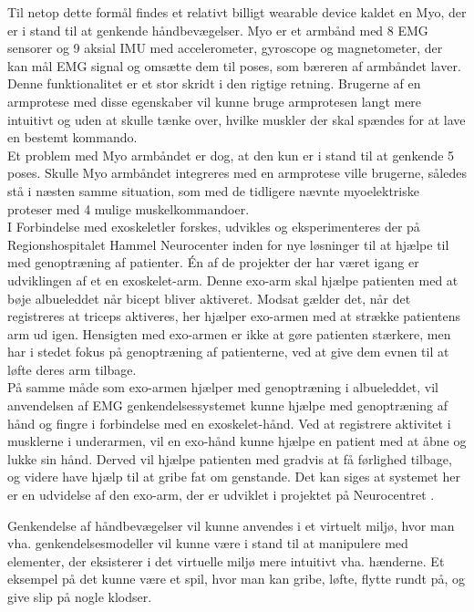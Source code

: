 Til netop dette formål findes et relativt billigt wearable device kaldet en Myo, der er i stand til at genkende håndbevægelser. Myo er et armbånd med 8 EMG sensorer og 9 aksial IMU med accelerometer, gyroscope og magnetometer, der kan mål EMG signal og omsætte dem til poses, som bæreren af armbåndet laver. \\
Denne funktionalitet er et stor skridt i den rigtige retning. Brugerne af en armprotese med disse egenskaber vil kunne bruge armprotesen langt mere intuitivt og uden at skulle tænke over, hvilke muskler der skal spændes for at lave en bestemt kommando.\\
Et problem med Myo armbåndet er dog, at den kun er i stand til at genkende 5 poses. Skulle Myo armbåndet integreres med en armprotese ville brugerne, således stå i næsten samme situation, som med de tidligere nævnte myoelektriske proteser med 4 mulige muskelkommandoer.\\

I Forbindelse med exoskeletler forskes, udvikles og eksperimenteres der på Regionshospitalet Hammel Neurocenter inden for nye løsninger til at hjælpe til med genoptræning af patienter. Én af de projekter der har været igang er udviklingen af et en exoskelet-arm. Denne exo-arm skal hjælpe patienten med at bøje albueleddet når bicept bliver aktiveret. Modsat gælder det, når det registreres at triceps aktiveres, her hjælper exo-armen med at strække patientens arm ud igen. Hensigten med exo-armen er ikke at gøre patienten stærkere, men har i stedet fokus på genoptræning af patienterne, ved at give dem evnen til at løfte deres arm tilbage.\\

På samme måde som exo-armen hjælper med genoptræning i albueleddet, vil anvendelsen af EMG genkendelsessystemet kunne hjælpe med genoptræning af hånd og fingre i forbindelse med en exoskelet-hånd. Ved at registrere aktivitet i musklerne i underarmen, vil en exo-hånd kunne hjælpe en patient med at åbne og lukke sin hånd. Derved vil hjælpe patienten med gradvis at få førlighed tilbage, og videre have hjælp til at gribe fat om genstande. Det kan siges at systemet her er en udvidelse af den exo-arm, der er udviklet i projektet på Neurocentret \citep{RefWorks:7}.

Genkendelse af håndbevægelser vil kunne anvendes i et virtuelt miljø, hvor man vha.  genkendelsesmodeller vil kunne være i stand til at manipulere med elementer, der eksisterer i det virtuelle miljø mere intuitivt vha. hænderne. Et eksempel på det kunne være et spil, hvor man kan gribe, løfte, flytte rundt på, og give slip på nogle klodser.
